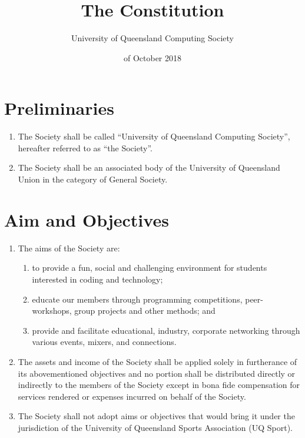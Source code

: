 \documentclass[a4paper]{article}
\newcommand*{\sectionr}[1]{{\raggedright \section{#1}}}
\begin{document}
\title{The Constitution}
\author{University of Queensland Computing Society}
\date{ of October 2018}
\maketitle
\def\contentsname{\empty}
\vspace{-2\baselineskip}
\tableofcontents
\newpage

\sectionr{Preliminaries}
\begin{enumerate}
\item The Society shall be called ``University of Queensland Computing Society'', hereafter referred to as ``the Society''.
\item The Society shall be an associated body of the University of Queensland Union in the category of General Society.
\end{enumerate}

\sectionr{Aim and Objectives}
\begin{enumerate}
\item The aims of the Society are:
	\begin{enumerate}
	\item to provide a fun, social and challenging environment for students interested in coding and technology;
	\item educate our members through programming competitions, peer-workshops, group projects and other methods; and
	\item provide and facilitate educational, industry, corporate networking through various events, mixers, and connections.
	\end{enumerate}
\item The assets and income of the Society shall be applied solely in furtherance of its above\textendash mentioned objectives and no portion shall be distributed directly or indirectly to the members of the Society except in bona fide compensation for services rendered or expenses incurred on behalf of the Society.
\item The Society shall not adopt aims or objectives that would bring it under the jurisdiction of the University of Queensland Sports Association (UQ Sport).
\end{enumerate}
\end{document}
